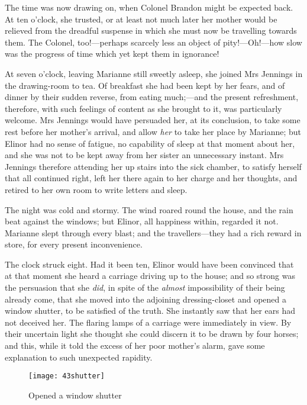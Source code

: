 The time was now drawing on, when Colonel Brandon might be expected back. At ten o'clock, she trusted, or at least not much later her mother would be relieved from the dreadful suspense in which she must now be travelling towards them. The Colonel, too!—perhaps scarcely less an object of pity!—Oh!—how slow was the progress of time which yet kept them in ignorance!

At seven o'clock, leaving Marianne still sweetly asleep, she joined Mrs Jennings in the drawing-room to tea. Of breakfast she had been kept by her fears, and of dinner by their sudden reverse, from eating much;—and the present refreshment, therefore, with such feelings of content as she brought to it, was particularly welcome. Mrs Jennings would have persuaded her, at its conclusion, to take some rest before her mother's arrival, and allow \textit{her} to take her place by Marianne; but Elinor had no sense of fatigue, no capability of sleep at that moment about her, and she was not to be kept away from her sister an unnecessary instant. Mrs Jennings therefore attending her up stairs into the sick chamber, to satisfy herself that all continued right, left her there again to her charge and her thoughts, and retired to her own room to write letters and sleep.

The night was cold and stormy. The wind roared round the house, and the rain beat against the windows; but Elinor, all happiness within, regarded it not. Marianne slept through every blast; and the travellers—they had a rich reward in store, for every present inconvenience.

The clock struck eight. Had it been ten, Elinor would have been convinced that at that moment she heard a carriage driving up to the house; and so strong was the persuasion that she \textit{did}, in spite of the \textit{almost} impossibility of their being already come, that she moved into the adjoining dressing-closet and opened a window shutter, to be satisfied of the truth. She instantly saw that her ears had not deceived her. The flaring lamps of a carriage were immediately in view. By their uncertain light she thought she could discern it to be drawn by four horses; and this, while it told the excess of her poor mother's alarm, gave some explanation to such unexpected rapidity.

\begin{a4}
	\begin{figure}[tbph]
		\centering
		\texttt{[image: 43shutter]}
		\caption{Opened a window shutter}
	\end{figure}
\end{a4}

